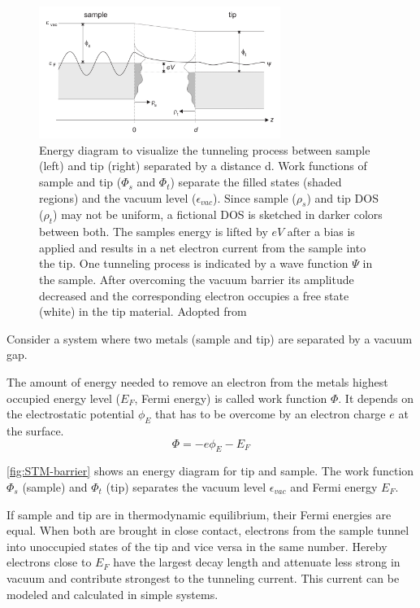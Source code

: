 \begin{figure}[]\centering
	\includegraphics[width=0.7\textwidth]{./images/tunnel-barrier}
	\caption{Energy diagram to visualize the tunneling process between sample (left) and tip (right) separated by a distance d. Work functions of sample and tip ($\Phi_s$ and $\Phi_t$) separate the filled states (shaded regions) and the vacuum level ($\epsilon_{vac}$). Since sample ($\rho_s$) and tip DOS ($\rho_t$) may not be uniform, a fictional DOS is sketched in darker colors between both. The samples energy is lifted by $eV$ after a bias is applied and results in a net electron current from the sample into the tip. One tunneling process is indicated by a wave function $\Psi$ in the sample. After overcoming the vacuum barrier its amplitude decreased and the corresponding electron occupies a free state (white) in the tip material.  Adopted from \cite{diss-schunack}}
	\label{fig:STM-barrier}
\end{figure}

Consider a system where two metals (sample and tip) are separated by a vacuum gap. 

The amount of energy needed to remove an electron from the metals highest occupied energy level ($E_F$, Fermi energy) is called work function $\Phi$. It depends on the electrostatic potential $\phi_E$ that has to be overcome by an electron charge $e$ at the surface.
$$ \Phi = -e \phi_E - E_F $$

\autoref{fig:STM-barrier} shows an energy diagram for tip and sample. The work function $\Phi_s$ (sample) and $\Phi_t$ (tip) separates the vacuum level $\epsilon_{vac}$ and Fermi energy $E_F$.

If sample and tip are in thermodynamic equilibrium, their Fermi energies are equal.
When both are brought in close contact, electrons from the sample tunnel into unoccupied states of the tip and vice versa in the same number. Hereby electrons close to $E_F$ have the largest decay length and attenuate less strong in vacuum and contribute strongest to the tunneling current. This current can be modeled and calculated in simple systems. 

